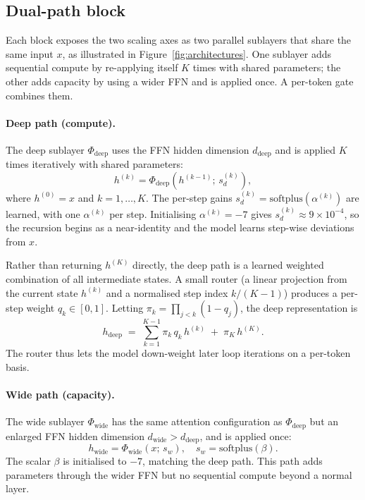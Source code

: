 \documentclass[11pt]{article}
\begin{document}
\subsection{Dual-path block}
\label{sec:method:dualpath}

Each block exposes the two scaling axes as two parallel sublayers that share the same input $x$, as illustrated in Figure~\ref{fig:architectures}. One sublayer adds sequential compute by re-applying itself $K$ times with shared parameters; the other adds capacity by using a wider FFN and is applied once. A per-token gate combines them. 

\paragraph{Deep path (compute).}
The deep sublayer $\Phi_{\text{deep}}$ uses the FFN hidden dimension $d_{\text{deep}}$ and is applied $K$ times iteratively with shared parameters:
\begin{equation}
\label{eq:deep}
h^{(k)} = \Phi_{\text{deep}}\!\left(h^{(k-1)};\, s^{(k)}_d\right),
\end{equation}
where $h^{(0)} = x$ and $k = 1,\dots,K$. The per-step gains
$s^{(k)}_d = \mathrm{softplus}(\alpha^{(k)})$ are learned, with one
$\alpha^{(k)}$ per step. Initialising $\alpha^{(k)} = -7$ gives
$s^{(k)}_d \approx 9 \times 10^{-4}$, so the recursion begins as a
near-identity and the model learns step-wise deviations from $x$.

Rather than returning $h^{(K)}$ directly, the deep path is a
learned weighted combination of all intermediate states. A small
router (a linear projection from the current state $h^{(k)}$ and a normalised step index $k/(K-1)$) produces a per-step weight $q_k \in [0,1]$. Letting
$\pi_k = \prod_{j<k}(1 - q_j)$, the deep representation is
\begin{equation}
\label{eq:deep-mix}
h_{\text{deep}} \;=\; \sum_{k=1}^{K-1} \pi_k\, q_k\, h^{(k)}
                    \;+\; \pi_K\, h^{(K)}.
\end{equation}
The router thus lets the model down-weight later loop iterations on a per-token basis. 

\paragraph{Wide path (capacity).}
The wide sublayer $\Phi_{\text{wide}}$ has the same attention
configuration as $\Phi_{\text{deep}}$ but an enlarged FFN hidden
dimension $d_{\text{wide}} > d_{\text{deep}}$, and is applied once:
\begin{equation}
\label{eq:wide}
h_{\text{wide}} = \Phi_{\text{wide}}(x;\, s_w), \quad s_w = \mathrm{softplus}(\beta).
\end{equation}
The scalar $\beta$ is initialised to $-7$, matching the deep path.
This path adds parameters through the wider FFN but no sequential
compute beyond a normal layer.
\end{document}
